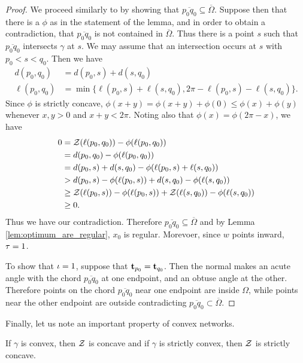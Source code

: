 \documentclass[11pt]{amsart}
\begin{document}
\begin{proof}
We proceed similarly to \cite{MR2794630} by showing that $\overline{p_0q_0} \subseteq \overline{\Omega}$. Suppose then that there is a $\phi$ as in the statement of the lemma, and in order to obtain a contradiction, that $\overline{p_0q_0}$ is not contained in $\overline{\Omega}$. Thus there is a point $s$ such that $\overline{p_0q_0}$ intersects $\gamma$ at $s$. We may assume that an intersection occurs at $s$ with $p_0 < s < q_0$. Then we have
\begin{align*}
d(p_0, q_0) &= d(p_0, s) + d(s, q_0) \\
\ell(p_0, q_0) &= \min\{\ell(p_0, s) + \ell(s, q_0),  2\pi -\ell(p_0,s ) - \ell(s, q_0)\}.
\end{align*}
Since $\phi$ is strictly concave, $\phi(x + y) = \phi(x + y) + \phi(0) \leq \phi(x) + \phi(y)$ whenever $x, y > 0$ and $x + y < 2\pi$. Noting also that $\phi(x) = \phi(2\pi - x)$, we have
\[
\begin{split}
0 &= \operatorname{\mathcal{Z}}(\ell(p_0, q_0)) - \phi(\ell(p_0, q_0)) \\
&=  d(p_0, q_0) - \phi(\ell(p_0, q_0)) \\
&= d(p_0, s) + d(s, q_0) - \phi(\ell(p_0, s) + \ell(s,  q_0)) \\
&> d(p_0, s) - \phi(\ell(p_0, s)) + d(s, q_0) - \phi(\ell(s, q_0)) \\
&\geq \operatorname{\mathcal{Z}}(\ell(p_0, s)) - \phi(\ell(p_0, s)) + \operatorname{\mathcal{Z}}(\ell(s, q_0)) - \phi(\ell(s, q_0)) \\
&\geq 0.
\end{split}
\]
Thus we have our contradiction. Therefore $\overline{p_0q_0} \subseteq \overline{\Omega}$ and by Lemma \ref{lem:optimum_are_regular}, \(x_0\) is regular. Morevoer, since $w$ points inward, $\operatorname{\tau} = 1$.

To show that $\operatorname{\iota} = 1$, suppose that $\operatorname{\mathbf{t}}_{p_0} = \operatorname{\mathbf{t}}_{q_0}$. Then the normal makes an acute angle with the chord $\overline{p_0 q_0}$ at one endpoint, and an obtuse angle at the other. Therefore points on the chord $\overline{p_0q_0}$ near one endpoint are inside $\Omega$, while points near the other endpoint are outside contradicting $\overline{p_0q_0} \subset \overline{\Omega}$.
\end{proof}

Finally, let us note an important property of convex networks.

\begin{theorem}
\label{thm:convex_network_concave_profile}

If $\gamma$ is convex, then $\operatorname{\mathcal{Z}}$ is concave and if $\gamma$ is strictly convex, then $\operatorname{\mathcal{Z}}$ is strictly concave.
\end{theorem}
\end{document}
